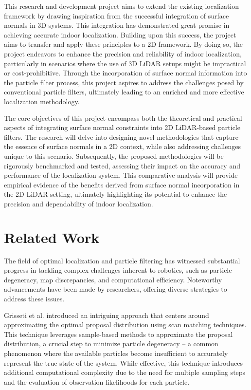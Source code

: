 \documentclass[rnd]{mas_proposal}
\begin{document}
This research and development project aims to extend the existing localization framework by drawing inspiration from the successful integration of surface normals in 3D systems. This integration has demonstrated great promise in achieving accurate indoor localization. Building upon this success, the project aims to transfer and apply these principles to a 2D framework. By doing so, the project endeavors to enhance the precision and reliability of indoor localization, particularly in scenarios where the use of 3D LiDAR setups might be impractical or cost-prohibitive. Through the incorporation of surface normal information into the particle filter process, this project aspires to address the challenges posed by conventional particle filters, ultimately leading to an enriched and more effective localization methodology.

The core objectives of this project encompass both the theoretical and practical aspects of integrating surface normal constraints into 2D LiDAR-based particle filters. The research will delve into designing novel methodologies that capture the essence of surface normals in a 2D context, while also addressing challenges unique to this scenario. Subsequently, the proposed methodologies will be rigorously benchmarked and tested, assessing their impact on the accuracy and performance of the localization system. This comparative analysis will provide empirical evidence of the benefits derived from surface normal incorporation in the 2D LiDAR setting, ultimately highlighting its potential to enhance the precision and dependability of indoor localization.

\section{Related Work}

The field of optimal localization and particle filtering has witnessed substantial progress in tackling complex challenges inherent to robotics, such as particle degeneracy, map discrepancies, and computational efficiency. Noteworthy advancements have been made by researchers, offering diverse strategies to address these issues.

Grisseti et al.\cite{4084563} introduced an intriguing approach that centers around approximating the optimal proposal distribution using scan matching techniques. This technique leverages sample-based methods to approximate the proposal distribution, a crucial step to minimize particle degeneracy – a common phenomenon where the available particles become insufficient to accurately represent the true state of the system. While effective, this technique introduces additional computational complexity due to the need for multiple sampling steps and the evaluation of observation likelihoods for each particle.
\end{document}
